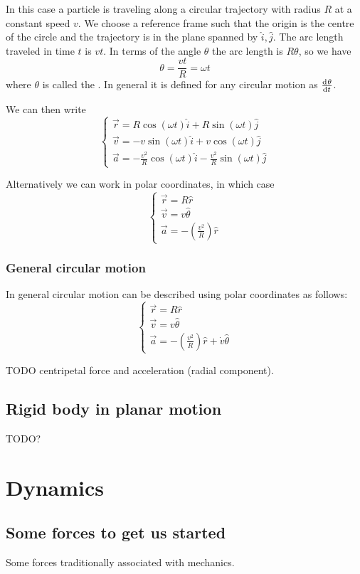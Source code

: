 In this case a particle is traveling along a circular trajectory with radius $R$ at a constant speed $v$. We choose a reference frame such that the origin is the centre of the circle and the trajectory is in the plane spanned by $\hat{i}, \hat{j}$. The arc length traveled in time $t$ is $vt$. In terms of the angle $\theta$ the arc length is $R\theta$, so we have
\[ \theta = \frac{vt}{R} = \omega t \]
where $\theta$ is called the . In general it is defined for any circular motion as $\od{\theta}{t}$.

We can then write
\[ \begin{cases}
\vec{r} = R\cos(\omega t)\hat{i} + R\sin(\omega t)\hat{j} \\
\vec{v} = - v\sin(\omega t)\hat{i} + v \cos(\omega t) \hat{j} \\
\vec{a} = - \frac{v^2}{R}\cos(\omega t)\hat{i} - \frac{v^2}{R}\sin(\omega t) \hat{j}
\end{cases} \]

Alternatively we can work in polar coordinates, in which case
\[ \begin{cases}
\vec{r} = R \hat{r}\\
\vec{v} = v \hat{\theta} \\
\vec{a} = - \left(\frac{v^2}{R}\right)\hat{r}
\end{cases} \]

\subsection{General circular motion}
In general circular motion can be described using polar coordinates as follows:
\[ \begin{cases}
\vec{r} = R \hat{r}\\
\vec{v} = v \hat{\theta} \\
\vec{a} = - \left(\frac{v^2}{R}\right)\hat{r} + \dot{v}\hat{\theta}
\end{cases} \]

TODO centripetal force and acceleration (radial component).

\section{Rigid body in planar motion}
TODO?

\chapter{Dynamics}
\section{Some forces to get us started}
Some forces traditionally associated with mechanics.

